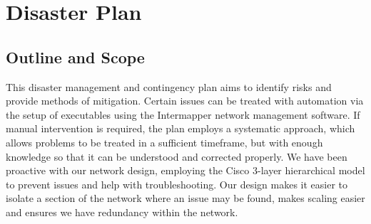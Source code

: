 \chapter{Disaster Plan}
\section{Outline and Scope}
This disaster management and contingency plan aims to identify risks and provide methods of mitigation. Certain issues can be treated with automation via the setup of executables using the Intermapper network management software. If manual intervention is required, the plan employs a systematic approach, which allows problems to be treated in a sufficient timeframe, but with enough knowledge so that it can be understood and corrected properly. We have been proactive with our network design, employing the Cisco 3-layer hierarchical model to prevent issues and help with troubleshooting. Our design makes it easier to isolate a section of the network where an issue may be found, makes scaling easier and ensures we have redundancy within the network.
